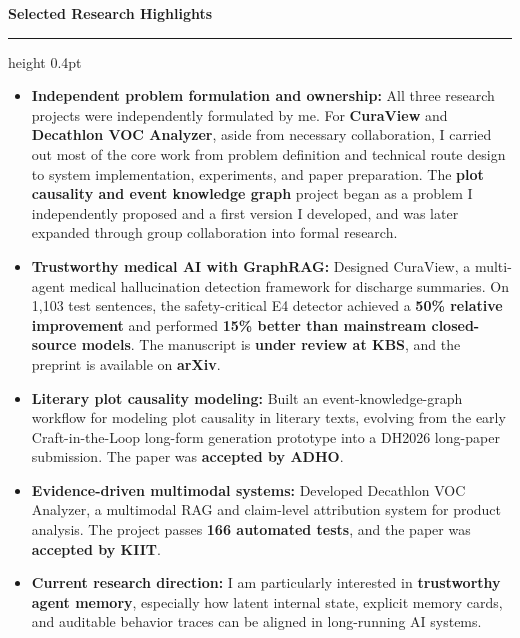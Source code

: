 \documentclass[10pt,a4paper]{article}
\newcommand{\cvsection}[1]{%
  \vspace{10pt}%
  {\Large\bfseries #1}\par%
  \vspace{1pt}%
  \hrule height 0.4pt%
  \vspace{3pt}%
}
\begin{document}
\cvsection{Selected Research Highlights}
\begin{itemize}
  \item \textbf{Independent problem formulation and ownership:} All three research projects were independently formulated by me. For \textbf{CuraView} and \textbf{Decathlon VOC Analyzer}, aside from necessary collaboration, I carried out most of the core work from problem definition and technical route design to system implementation, experiments, and paper preparation. The \textbf{plot causality and event knowledge graph} project began as a problem I independently proposed and a first version I developed, and was later expanded through group collaboration into formal research.
  \item \textbf{Trustworthy medical AI with GraphRAG:} Designed CuraView, a multi-agent medical hallucination detection framework for discharge summaries. On 1,103 test sentences, the safety-critical E4 detector achieved a \textbf{50\% relative improvement} and performed \textbf{15\% better than mainstream closed-source models}. The manuscript is \textbf{under review at KBS}, and the preprint is available on \textbf{arXiv}.
  \item \textbf{Literary plot causality modeling:} Built an event-knowledge-graph workflow for modeling plot causality in literary texts, evolving from the early Craft-in-the-Loop long-form generation prototype into a DH2026 long-paper submission. The paper was \textbf{accepted by ADHO}.
  \item \textbf{Evidence-driven multimodal systems:} Developed Decathlon VOC Analyzer, a multimodal RAG and claim-level attribution system for product analysis. The project passes \textbf{166 automated tests}, and the paper was \textbf{accepted by KIIT}.
  \item \textbf{Current research direction:} I am particularly interested in \textbf{trustworthy agent memory}, especially how latent internal state, explicit memory cards, and auditable behavior traces can be aligned in long-running AI systems.
\end{itemize}
\end{document}
